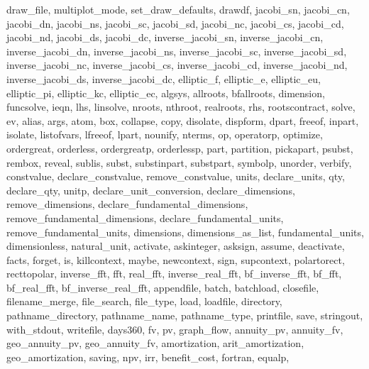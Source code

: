 {{    draw_file,
    multiplot_mode,
    set_draw_defaults,
    drawdf,
    jacobi_sn,
    jacobi_cn,
    jacobi_dn,
    jacobi_ns,
    jacobi_sc,
    jacobi_sd,
    jacobi_nc,
    jacobi_cs,
    jacobi_cd,
    jacobi_nd,
    jacobi_ds,
    jacobi_dc,
    inverse_jacobi_sn,
    inverse_jacobi_cn,
    inverse_jacobi_dn,
    inverse_jacobi_ns,
    inverse_jacobi_sc,
    inverse_jacobi_sd,
    inverse_jacobi_nc,
    inverse_jacobi_cs,
    inverse_jacobi_cd,
    inverse_jacobi_nd,
    inverse_jacobi_ds,
    inverse_jacobi_dc,
    elliptic_f,
    elliptic_e,
    elliptic_eu,
    elliptic_pi,
    elliptic_kc,
    elliptic_ec,
    algsys,
    allroots,
    bfallroots,
    dimension,
    funcsolve,
    ieqn,
    lhs,
    linsolve,
    nroots,
    nthroot,
    realroots,
    rhs,
    rootscontract,
    solve,
    ev,
    alias,
    args,
    atom,
    box,
    collapse,
    copy,
    disolate,
    dispform,
    dpart,
    freeof,
    inpart,
    isolate,
    listofvars,
    lfreeof,
    lpart,
    nounify,
    nterms,
    op,
    operatorp,
    optimize,
    ordergreat,
    orderless,
    ordergreatp,
    orderlessp,
    part,
    partition,
    pickapart,
    psubst,
    rembox,
    reveal,
    sublis,
    subst,
    substinpart,
    substpart,
    symbolp,
    unorder,
    verbify,
    constvalue,
    declare_constvalue,
    remove_constvalue,
    units,
    declare_units,
    qty,
    declare_qty,
    unitp,
    declare_unit_conversion,
    declare_dimensions,
    remove_dimensions,
    declare_fundamental_dimensions,
    remove_fundamental_dimensions,
    declare_fundamental_units,
    remove_fundamental_units,
    dimensions,
    dimensions_as_list,
    fundamental_units,
    dimensionless,
    natural_unit,
    activate,
    askinteger,
    asksign,
    assume,
    deactivate,
    facts,
    forget,
    is,
    killcontext,
    maybe,
    newcontext,
    sign,
    supcontext,
    polartorect,
    recttopolar,
    inverse_fft,
    fft,
    real_fft,
    inverse_real_fft,
    bf_inverse_fft,
    bf_fft,
    bf_real_fft,
    bf_inverse_real_fft,
    appendfile,
    batch,
    batchload,
    closefile,
    filename_merge,
    file_search,
    file_type,
    load,
    loadfile,
    directory,
    pathname_directory,
    pathname_name,
    pathname_type,
    printfile,
    save,
    stringout,
    with_stdout,
    writefile,
    days360,
    fv,
    pv,
    graph_flow,
    annuity_pv,
    annuity_fv,
    geo_annuity_pv,
    geo_annuity_fv,
    amortization,
    arit_amortization,
    geo_amortization,
    saving,
    npv,
    irr,
    benefit_cost,
    fortran,
    equalp,
}}
